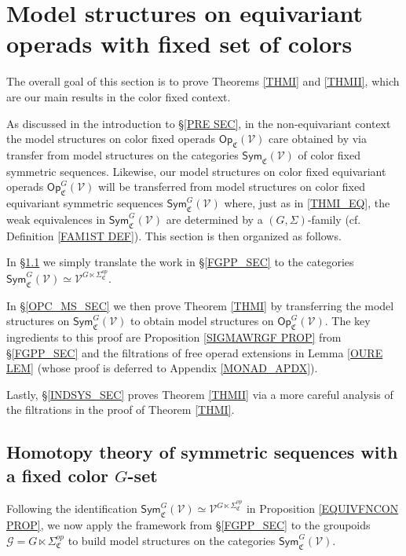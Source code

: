 \documentclass[a4paper,10pt
,draft
]{article}%
\numberwithin{equation}{section}
\numberwithin{figure}{section}
\theoremstyle{definition} %
\newcommand{\V}{\ensuremath{\mathcal V}}
\newcommand{\G}{\ensuremath{\mathcal G}}
\newcommand{\1}{\ensuremath{\mathbbm 1}}%
\begin{document}
\section{Model structures on equivariant operads with fixed set of colors}\label{FIXCOL SEC}


The overall goal of this section is to prove 
Theorems \ref{THMI} and \ref{THMII},
which are our main results in the color fixed context.

As discussed in the introduction to \S \ref{PRE SEC},
in the non-equivariant context the model structures on 
color fixed operads $\mathsf{Op}_{\mathfrak{C}}(\V)$
care obtained by via transfer from model structures on the categories
$\mathsf{Sym}_{\mathfrak{C}}(\V)$
of color fixed symmetric sequences.
Likewise, our model structures 
on color fixed equivariant operads 
$\mathsf{Op}^G_{\mathfrak{C}}(\V)$
will be transferred from model structures on 
color fixed equivariant symmetric sequences
$\mathsf{Sym}^G_{\mathfrak{C}}(\V)$
where, just as in \eqref{THMI_EQ},
the weak equivalences in 
$\mathsf{Sym}^G_{\mathfrak{C}}(\V)$
are determined by a $(G,\Sigma)$-family
(cf. Definition \ref{FAM1ST DEF}).
This section is then organized as follows.

In \S \ref{SYMC_MS_SEC} we simply translate
the work in \S \ref{FGPP_SEC} to the categories 
$\mathsf{Sym}^{G}_{\mathfrak{C}}(\V)
\simeq \V^{G \ltimes \Sigma^{op}_{\mathfrak{C}}}$.

In \S \ref{OPC_MS_SEC}
we then prove Theorem \ref{THMI} by transferring the model structures on 
$\mathsf{Sym}^{G}_{\mathfrak{C}}(\V)$ to obtain model structures on
$\mathsf{Op}^{G}_{\mathfrak{C}}(\V)$.
The key ingredients to this proof are
Proposition \ref{SIGMAWRGF PROP} from \S \ref{FGPP_SEC} and
the filtrations of free operad extensions 
in Lemma \ref{OURE LEM}
(whose proof is deferred to Appendix \ref{MONAD_APDX}).

Lastly, \S \ref{INDSYS_SEC} proves 
Theorem \ref{THMII} via a more careful analysis
of the filtrations in the proof of Theorem \ref{THMI}.








\subsection{Homotopy theory of symmetric sequences with a fixed color $G$-set}
\label{SYMC_MS_SEC}


Following the identification 
$\mathsf{Sym}^G_{\mathfrak{C}}(\V)
\simeq \V^{G \ltimes \Sigma^{op}_{\mathfrak{C}}}$
in Proposition \ref{EQUIVFNCON PROP},
we now apply the framework from \S \ref{FGPP_SEC}  
to the groupoids
$\G = G \ltimes \Sigma_{\mathfrak C}^{op}$
to build model structures on the categories 
$\mathsf{Sym}^G_{\mathfrak{C}}(\V)$.
%
\end{document}
